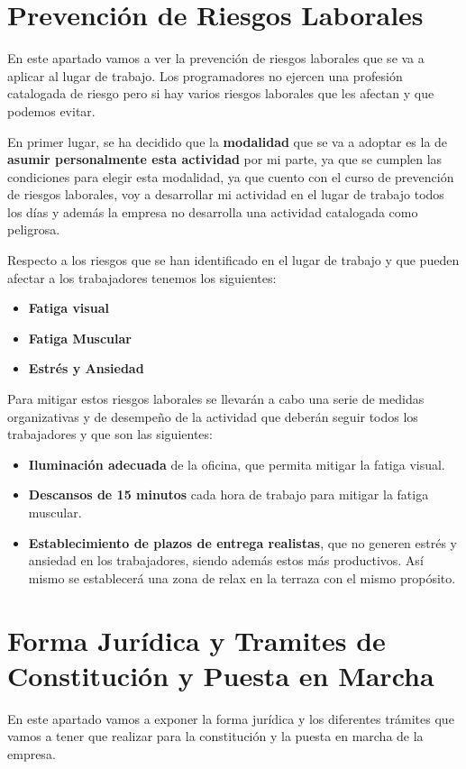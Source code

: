 \section{Prevención de Riesgos Laborales}
En este apartado vamos a ver la prevención de riesgos laborales que se va a aplicar al lugar de trabajo. Los programadores no ejercen una profesión catalogada de riesgo pero si hay varios riesgos laborales que les afectan y que podemos evitar.

En primer lugar, se ha decidido que la \textbf{modalidad} que se va a adoptar es la de \textbf{asumir personalmente esta actividad} por mi parte, ya que se cumplen las condiciones para elegir esta modalidad, ya que cuento con el curso de prevención de riesgos laborales, voy a desarrollar mi actividad en el lugar de trabajo todos los días y además la empresa no desarrolla una actividad catalogada como peligrosa.

Respecto a los riesgos que se han identificado en el lugar de trabajo y que pueden afectar a los trabajadores tenemos los siguientes:

\begin{itemize}
    \item \textbf{Fatiga visual}
    \item \textbf{Fatiga Muscular}
    \item \textbf{Estrés y Ansiedad}
\end{itemize}

Para mitigar estos riesgos laborales se llevarán a cabo una serie de medidas organizativas y de desempeño de la actividad que deberán seguir todos los trabajadores y que son las siguientes:

\begin{itemize}
    \item \textbf{Iluminación adecuada} de la oficina, que permita mitigar la fatiga visual.
    \item \textbf{Descansos de 15 minutos} cada hora de trabajo para mitigar la fatiga muscular.
    \item \textbf{Establecimiento de plazos de entrega realistas}, que no generen estrés y ansiedad en los trabajadores, siendo además
    estos más productivos. Así mismo se establecerá una zona de relax en la terraza con el mismo propósito.
\end{itemize}

\section{Forma Jurídica y Tramites de Constitución y Puesta en Marcha}
En este apartado vamos a exponer la forma jurídica y los diferentes trámites que vamos a tener que realizar para la constitución y la puesta en marcha de la empresa.

